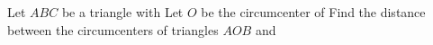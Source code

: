Let $ABC$ be a triangle with    Let $O$ be the circumcenter of  Find the distance between the circumcenters of triangles $AOB$ and 